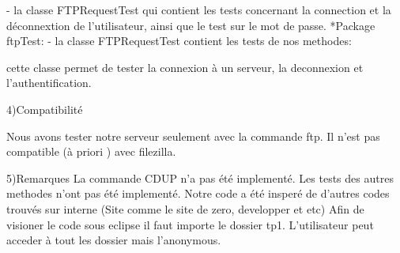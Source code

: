 		- la classe FTPRequestTest qui contient les tests concernant la connection et la déconnextion de l'utilisateur, ainsi que le test sur le  mot de passe.
        *Package ftpTest:
                - la classe FTPRequestTest contient les tests de nos methodes:

                        cette classe permet de tester la connexion à un serveur, la deconnexion et l'authentification.
                
			
	4)Compatibilité

		Nous avons tester notre serveur seulement avec la commande ftp. Il n'est pas compatible (à priori ) avec filezilla.	

	5)Remarques
	       La commande CDUP n'a pas été implementé.
               Les tests des autres methodes n'ont pas été implementé.
               Notre code a été insperé de d'autres codes trouvés sur interne (Site comme le site de zero, developper et etc)
               Afin de visioner le code sous eclipse il faut importe le dossier tp1.
               L'utilisateur peut acceder à tout les dossier mais l'anonymous.
